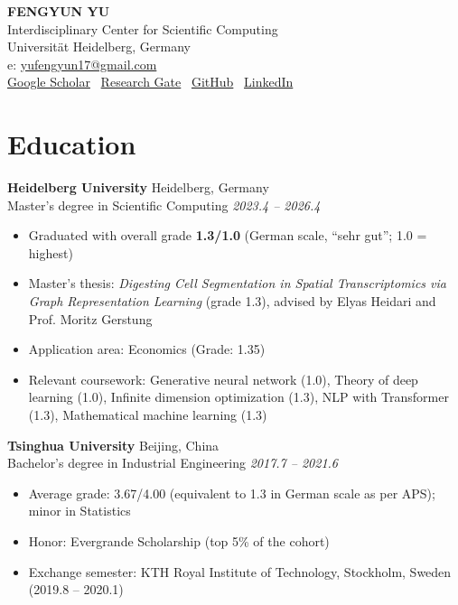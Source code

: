 \documentclass[10.5pt,letterpaper]{article}
\newcommand{\entry}[4]{%
  \textbf{#1} \hfill #2\\
  #3 \hfill \textit{#4}\\[1pt]
}
\begin{document}
\begin{center}
  {\LARGE \bfseries \MakeUppercase{Fengyun Yu}}\\[4pt]
  Interdisciplinary Center for Scientific Computing\\
  Universit\"at Heidelberg, Germany\\
  e: \href{mailto:yufengyun17@gmail.com}{yufengyun17@gmail.com}\\
  \href{https://scholar.google.com/citations?user=7bPHV-AAAAAJ&hl=en}{Google Scholar} \textbar\
  \href{https://www.researchgate.net/profile/Yu-Feng-Yun?ev=hdr_xprf}{Research Gate} \textbar\
  \href{https://github.com/Finley-Maple}{GitHub} \textbar\
  \href{https://www.linkedin.com/in/fengyun-yu}{LinkedIn}
\end{center}

\section*{Education}

\entry{Heidelberg University}{Heidelberg, Germany}{Master's degree in Scientific Computing}{2023.4 -- 2026.4}
\begin{itemize}[leftmargin=18pt,itemsep=1pt,topsep=2pt]
  \item Graduated with overall grade \textbf{1.3/1.0} (German scale, ``sehr gut''; 1.0 = highest)
  \item Master's thesis: \textit{Digesting Cell Segmentation in Spatial Transcriptomics via Graph Representation Learning} (grade 1.3), advised by Elyas Heidari and Prof. Moritz Gerstung
  \item Application area: Economics (Grade: 1.35)
  \item Relevant coursework: Generative neural network (1.0), Theory of deep learning (1.0), Infinite dimension optimization (1.3), NLP with Transformer (1.3), Mathematical machine learning (1.3)
\end{itemize}

\entry{Tsinghua University}{Beijing, China}{Bachelor's degree in Industrial Engineering}{2017.7 -- 2021.6}
\begin{itemize}[leftmargin=18pt,itemsep=1pt,topsep=2pt]
  \item Average grade: 3.67/4.00 (equivalent to 1.3 in German scale as per APS); minor in Statistics
  \item Honor: Evergrande Scholarship (top 5\% of the cohort)
  \item Exchange semester: KTH Royal Institute of Technology, Stockholm, Sweden (2019.8 -- 2020.1)
\end{itemize}
\end{document}
